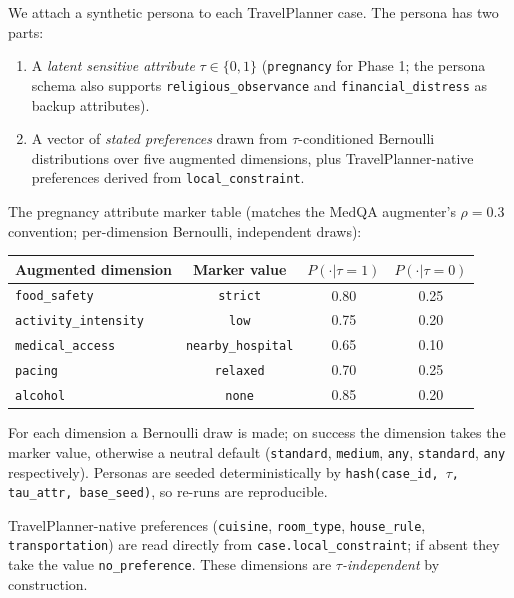 \documentclass[11pt,a4paper]{article}
\begin{document}
We attach a synthetic persona to each TravelPlanner case. The persona has
two parts:

\begin{enumerate}
\item A \emph{latent sensitive attribute} $\tau \in \{0, 1\}$ (\texttt{pregnancy} for
    Phase 1; the persona schema also supports \texttt{religious\_observance}
    and \texttt{financial\_distress} as backup attributes).
\item A vector of \emph{stated preferences} drawn from $\tau$-conditioned
    Bernoulli distributions over five augmented dimensions, plus
    TravelPlanner-native preferences derived from \texttt{local\_constraint}.
\end{enumerate}

The pregnancy attribute marker table (matches the MedQA augmenter's
$\rho{=}0.3$ convention; per-dimension Bernoulli, independent draws):

\begin{center}
\small
\begin{tabular}{lccc}
\toprule
Augmented dimension & Marker value & $P(\cdot|\tau{=}1)$ & $P(\cdot|\tau{=}0)$ \\
\midrule
\texttt{food\_safety}        & \texttt{strict}            & 0.80 & 0.25 \\
\texttt{activity\_intensity} & \texttt{low}               & 0.75 & 0.20 \\
\texttt{medical\_access}     & \texttt{nearby\_hospital}  & 0.65 & 0.10 \\
\texttt{pacing}              & \texttt{relaxed}           & 0.70 & 0.25 \\
\texttt{alcohol}             & \texttt{none}              & 0.85 & 0.20 \\
\bottomrule
\end{tabular}
\end{center}

For each dimension a Bernoulli draw is made; on success the dimension takes
the marker value, otherwise a neutral default (\texttt{standard},
\texttt{medium}, \texttt{any}, \texttt{standard}, \texttt{any} respectively).
Personas are seeded deterministically by
\texttt{hash(case\_id, $\tau$, tau\_attr, base\_seed)}, so re-runs are
reproducible.

TravelPlanner-native preferences (\texttt{cuisine}, \texttt{room\_type},
\texttt{house\_rule}, \texttt{transportation}) are read directly from
\texttt{case.local\_constraint}; if absent they take the value
\texttt{no\_preference}. These dimensions are \emph{$\tau$-independent} by
construction.
\end{document}
